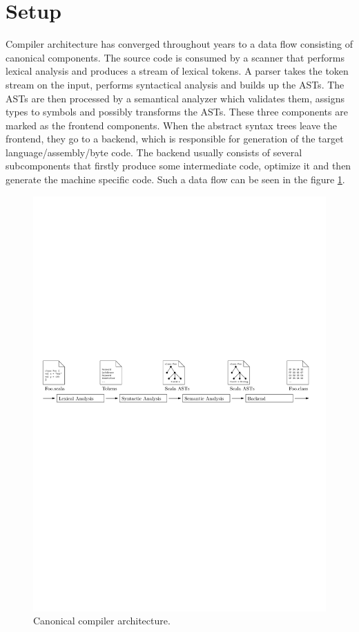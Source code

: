 \documentclass[12pt,a4paper]{report}
\begin{document}
\section{Setup}

Compiler architecture has converged throughout years to a data flow consisting of canonical components. The source code is consumed by a scanner that performs lexical analysis and produces a stream of lexical tokens. A parser takes the token stream on the input, performs syntactical analysis and builds up the ASTs. The ASTs are then processed by a semantical analyzer which validates them, assigns types to symbols and possibly transforms the ASTs. These three components are marked as the frontend components. When the abstract syntax trees leave the frontend, they go to a backend, which is responsible for generation of the target language/assembly/byte code. The backend usually consists of several subcomponents that firstly produce some intermediate code, optimize it and then generate the machine specific code. Such a data flow can be seen in the figure \ref{Compiler}.

\begin{figure}[ht]
  \centering
	\includegraphics[width=\linewidth,height=\textheight,keepaspectratio]{img/Compiler.pdf}
	\caption{Canonical compiler architecture.}
	\label{Compiler}
\end{figure}
\end{document}
